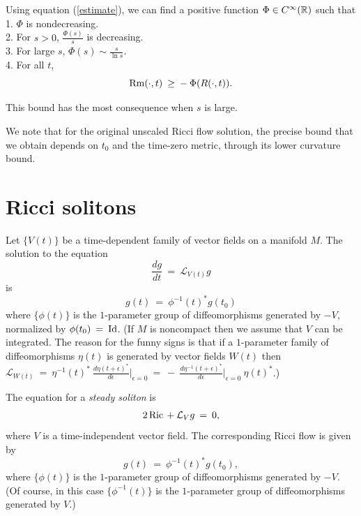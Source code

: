 Using equation (\ref{estimate}), we can find a positive
function $\Phi \in C^\infty({\mathbb R})$ such that \\
1. $\Phi$ is nondecreasing. \\
2. For $s > 0$, $\frac{\Phi(s)}{s}$ is decreasing. \\
3. For large $s$,
$\Phi(s) \sim \frac{s}{\ln s}$. \\
4. For all $t$,
\begin{equation} \label{phi}
\operatorname{Rm}(\cdot, t) \: \ge \: - \: \Phi(R(\cdot, t)).
\end{equation}

This bound has the most consequence when $s$ is large.

We note that for the original unscaled Ricci flow
solution, the precise
bound that we obtain
depends on $t_0$ and
the time-zero metric, through its lower curvature bound.

\section{Ricci solitons} \label{Riccisolitons}

Let $\{V(t)\}$ be a time-dependent family of vector fields on a manifold $M$.
The solution to the equation
\begin{equation}
\frac{dg}{dt} \: = \: {\mathcal L}_{V(t)} g
\end{equation}
is
\begin{equation}
g(t) \: = \: \phi^{-1}(t)^* g(t_0)
\end{equation}
where $\{ \phi(t) \}$ is the $1$-parameter group of diffeomorphisms generated
by $- V$, normalized by $\phi(t_0) \: = \: \operatorname{Id}$.
(If $M$ is noncompact then we assume that $V$ can be integrated.
The reason for the funny signs is that if a $1$-parameter family of
diffeomorphisms $\eta(t)$ is generated by vector fields $W(t)$ then
${\mathcal L}_{W(t)} \: = \: \eta^{-1}(t)^* \:
\frac{d\eta(t+\epsilon)^*}{d\epsilon} \Big|_{\epsilon = 0} \: = \: - \:
\frac{d\eta^{-1}(t+\epsilon)^*}{d\epsilon} \Big|_{\epsilon = 0} \: \eta(t)^*$.)

The equation for a {\em steady soliton} is
\begin{equation}
2 \operatorname{Ric} \: + \: {\mathcal L}_V g \: = \: 0,
\end{equation}
where $V$ is a time-independent
vector field.
The corresponding Ricci flow is given by
\begin{equation}
g(t) \: = \: \phi^{-1}(t)^* g(t_0),
\end{equation}
where $\{ \phi(t) \}$ is the $1$-parameter group of diffeomorphisms generated
by $- V$. (Of course, in this case
$\{ \phi^{-1}(t) \}$ is the $1$-parameter group of diffeomorphisms generated
by $V$.)

